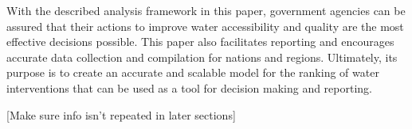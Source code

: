 With the described analysis framework in this paper, government agencies can be assured that their actions to improve water accessibility and quality are the most effective decisions possible.
This paper also facilitates reporting and encourages accurate data collection and compilation for nations and regions.
Ultimately, its purpose is to create an accurate and scalable model for the ranking of water interventions that can be used as a tool for decision making and reporting.

[Make sure info isn't repeated in later sections]
